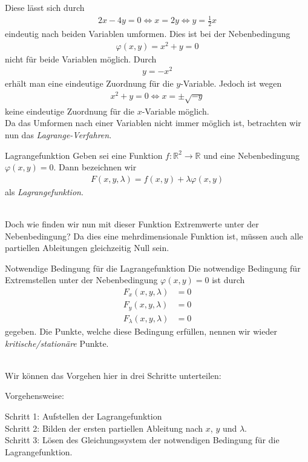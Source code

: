 Diese lässt sich durch
\begin{align*}
2x - 4 y = 0 
\Leftrightarrow
x = 2y
\Leftrightarrow
y = \frac{1}{2} x
\end{align*}
eindeutig nach beiden Variablen umformen.
\newpage
Dies ist bei der Nebenbedingung
\begin{align*}
\varphi(x,y) = x^2 + y = 0
\end{align*}
nicht für beide Variablen möglich.
Durch 
\begin{align*}
y = -x^2 
\end{align*}
erhält man eine eindeutige Zuordnung für die $y $-Variable.
Jedoch ist wegen
\begin{align*}
x^2 + y = 0
\Leftrightarrow
x = \pm \sqrt{-y}
\end{align*}
keine eindeutige Zuordnung für die $x$-Variable möglich.\\

Da das Umformen nach einer Variablen nicht immer möglich ist, betrachten wir nun das \textit{Lagrange-Verfahren}.
\begin{mybox}{Lagrangefunktion}
Geben sei eine Funktion $f : \mathbb{R}^2 \to \mathbb{R}$ und eine Nebenbedingung 
$\varphi(x,y) = 0$.
Dann bezeichnen wir 
\begin{align*}
F(x,y,\lambda) = f(x,y) + \lambda \varphi(x,y) 
\end{align*}
als \textit{Lagrangefunktion}.
\end{mybox}
\ \\
Doch wie finden wir nun mit dieser Funktion Extremwerte unter der Nebenbedingung?
Da dies eine mehrdimensionale Funktion ist, müssen auch alle partiellen Ableitungen gleichzeitig Null sein.\\

\begin{mybox}{Notwendige Bedingung für die Lagrangefunktion}
Die notwendige Bedingung für Extremstellen unter der Nebenbedingung $\varphi(x,y) = 0$
ist durch
\begin{align*}
F_x(x,y,\lambda )&= 0\\
F_y(x,y,\lambda) &= 0\\
F_\lambda(x,y,\lambda) &= 0
\end{align*}
gegeben.
Die Punkte, welche diese Bedingung erfüllen, nennen wir wieder \textit{kritische/stationäre} Punkte.
\end{mybox}
\ \\
Wir können das Vorgehen hier in drei Schritte unterteilen:
\begin{mybox}{Vorgehensweise:}

Schritt 1: Aufstellen der Lagrangefunktion\\
Schritt 2: Bilden der ersten partiellen Ableitung nach $x$, $y$ und $\lambda$.\\
Schritt 3: Lösen des Gleichungssystem der notwendigen Bedingung für die Lagrangefunktion.

\end{mybox}
\newpage
